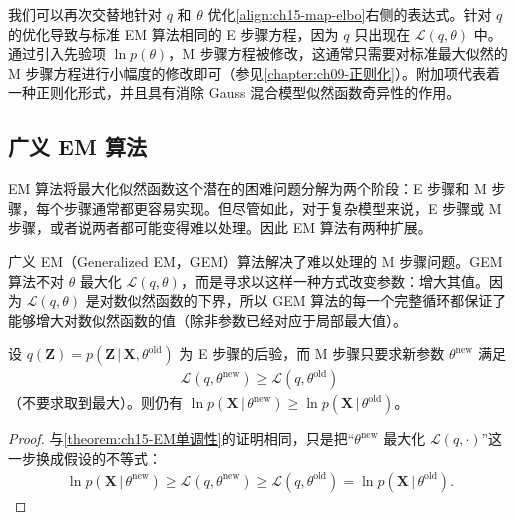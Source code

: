 \documentclass[../../main.tex]{subfiles}
\begin{document}
我们可以再次交替地针对 $q$ 和 $\theta$ 优化\eqref{align:ch15-map-elbo}右侧的表达式。针对 $q$ 的优化导致与标准 EM 算法相同的 E 步骤方程，因为 $q$ 只出现在 $\mathcal{L}(q,\theta)$ 中。通过引入先验项 $\ln p(\theta)$，M 步骤方程被修改，这通常只需要对标准最大似然的 M 步骤方程进行小幅度的修改即可（参见\cref{chapter:ch09-正则化}）。附加项代表着一种正则化形式，并且具有消除 Gauss 混合模型似然函数奇异性的作用。

\subsection{广义 EM 算法}\label{subsection:ch15-广义em}

EM 算法将最大化似然函数这个潜在的困难问题分解为两个阶段：E 步骤和 M 步骤，每个步骤通常都更容易实现。但尽管如此，对于复杂模型来说，E 步骤或 M 步骤，或者说两者都可能变得难以处理。因此 EM 算法有两种扩展。

广义 EM（Generalized EM，GEM）算法解决了难以处理的 M 步骤问题。GEM 算法不对 $\theta$ 最大化 $\mathcal{L}(q,\theta)$，而是寻求以这样一种方式改变参数：增大其值。因为 $\mathcal{L}(q,\theta)$ 是对数似然函数的下界，所以 GEM 算法的每一个完整循环都保证了能够增大对数似然函数的值（除非参数已经对应于局部最大值）。

\begin{proposition}\label{proposition:ch15-GEM单调性}
设 $q(\bm{Z})=p(\bm{Z}\,|\,\bm{X},\theta^{\text{old}})$ 为 E 步骤的后验，而 M 步骤只要求新参数 $\theta^{\text{new}}$ 满足
\begin{align*}
\mathcal{L}(q,\theta^{\text{new}})\geqslant\mathcal{L}(q,\theta^{\text{old}})
\end{align*}
（不要求取到最大）。则仍有 $\ln p(\bm{X}\,|\,\theta^{\text{new}})\geqslant\ln p(\bm{X}\,|\,\theta^{\text{old}})$。
\end{proposition}
\begin{proof}
与\cref{theorem:ch15-EM单调性}的证明相同，只是把“$\theta^{\text{new}}$ 最大化 $\mathcal{L}(q,\cdot)$”这一步换成假设的不等式：
\begin{align*}
\ln p(\bm{X}\,|\,\theta^{\text{new}})\geqslant\mathcal{L}(q,\theta^{\text{new}})\geqslant\mathcal{L}(q,\theta^{\text{old}})=\ln p(\bm{X}\,|\,\theta^{\text{old}}).
\end{align*}
\end{proof}
\end{document}
